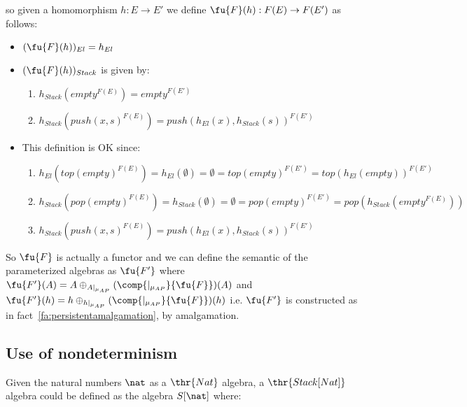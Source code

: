 so given a homomorphism $h:E \to E'$ we define $\fu{F}(h):F(E) \to F(E')$ as follows:
	\begin{itemize}
	\item $(\fu{F}(h))_{El}= h_{El}$		
	\item $(\fu{F}(h))_{Stack}$ is given by:
		\begin{enumerate}
		\item $h_{Stack}(empty^{F(E)})= empty^{F(E')}$
		\item $h_{Stack}(push(x,s)^{F(E)}) = push(h_{El}(x),h_{Stack}(s))^{F(E')}$
		\end{enumerate} 
	\item This definition is OK since:
		\begin{enumerate} 
		\item $h_{El}(top(empty)^{F(E)})= h_{El}(\emptyset) = \emptyset =top(empty)^{F(E')} = top(h_{El}(empty))^{F(E')}$
		\item $h_{Stack}(pop(empty)^{F(E)})= h_{Stack}(\emptyset) = \emptyset= pop(empty)^{F(E')}= pop(h_{Stack}(empty^{F(E)}))$
		
		\item $h_{Stack}(push(x,s)^{F(E)}) = push(h_{El}(x),h_{Stack}(s))^{F(E')}$
		\end{enumerate}
	\end{itemize}
So $\fu{F}$ is actually a functor and we can define the semantic of the parameterized algebras as $\fu{F'}$ where $\fu{F'}(A) = A \oplus_{A |_{\mu_{AP}}} (\comp{|_{\mu_{AP}}}{\fu{F}}) (A)$ and $\fu{F'}(h) = h \oplus_{h |_{\mu_{AP}}} (\comp{|_{\mu_{AP}}}{\fu{F}}) (h)$ i.e. $\fu{F'}$ is constructed as in fact~\ref{fa:persistentamalgamation}, by amalgamation.


\subsection{Use of nondeterminism}
Given the natural numbers $\nat$ as a $\thr{Nat}$ algebra, a $\thr{Stack[Nat]}$ algebra could be defined as the algebra $S[\nat]$ where:

